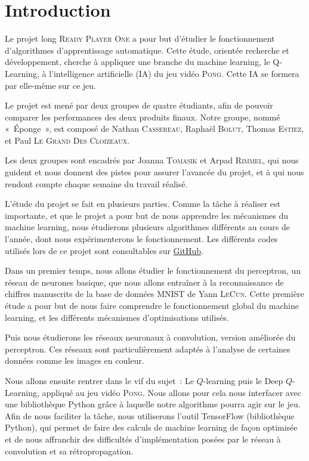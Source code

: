\section*{Introduction}

Le projet long \textsc{Ready Player One} a pour but d’étudier le fonctionnement d’algorithmes d'apprentissage automatique. Cette étude, 
orientée recherche et développement, cherche à appliquer une branche du machine learning, le Q-Learning, à l’intelligence artificielle (IA)
du jeu vidéo \textsc{Pong}. Cette IA se formera par elle-même sur ce jeu.

Le projet est mené par deux groupes de quatre étudiants, afin de pouvoir comparer les performances des deux produits finaux. 
Notre groupe, nommé « Éponge », est composé de Nathan \textsc{Cassereau}, Raphaël \textsc{Bolut}, Thomas \textsc{Estiez}, et 
Paul \textsc{Le Grand Des Cloizeaux}. 

Les deux groupes sont encadrés par Joanna \textsc{Tomasik} et Arpad \textsc{Rimmel}, qui nous guident et nous donnent des pistes
pour assurer l'avancée du projet, et à qui nous rendont compte chaque semaine du travail réalisé.

L’étude du projet se fait en plusieurs parties. Comme la tâche à réaliser est importante, et que le projet a pour but 
de nous apprendre les mécanismes du machine learning, nous étudierons plusieurs algorithmes différents au cours de l’année, dont nous expérimenterons
le fonctionnement. 
Les différents codes utilisés lors de ce projet sont consultables sur \href{https://github.com/ready-player-one-supelec}{GitHub}.

Dans un premier temps, nous allons étudier le fonctionnement du perceptron, un réseau de neurones basique, que nous allons entraîner 
à la reconnaissance de chiffres manuscrits de la base de données MNIST de Yann \textsc{LeCun}. Cette première étude a pour but de nous faire 
comprendre le fonctionnement global du machine learning, et les différents mécanismes d’optimisations utilisés.
 
Puis nous étudierons les réseaux neuronaux à convolution, version améliorée du perceptron. Ces réseaux sont particulièrement adaptés à l'analyse
de certaines données comme les images en couleur.

Nous allons ensuite rentrer dans le vif du sujet : Le $Q$-learning puis le Deep $Q$-Learning, appliqué au jeu vidéo \textsc{Pong}. 
Nous allons pour cela nous interfacer avec une bibliothèque Python grâce à laquelle notre algorithme pourra agir sur le jeu. Afin de nous faciliter la tâche, nous 
utiliserons l’outil TensorFlow (bibliothèque Python), qui permet de faire des calculs de machine learning de façon optimisée et de nous affranchir
des difficultés d'implémentation posées par le réseau à convolution et sa rétropropagation.
